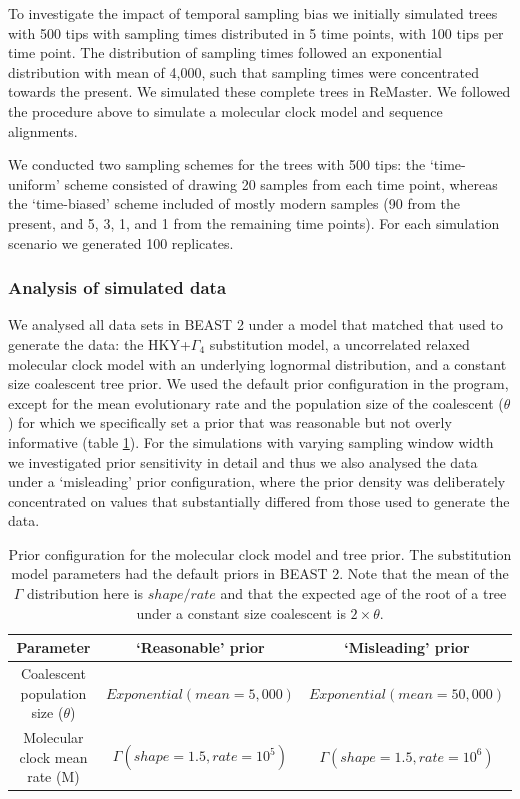 \documentclass[11pt]{article}
\begin{document}
To investigate the impact of temporal sampling bias we initially simulated trees with 500 tips with sampling times distributed in 5 time points, with 100 tips per time point. The distribution of sampling times followed an exponential distribution with mean of 4,000, such that sampling times were concentrated towards the present. We simulated these complete trees in ReMaster. We followed the procedure above to simulate a molecular clock model and sequence alignments. 

We conducted two sampling schemes for the trees with 500 tips: the `time-uniform' scheme consisted of drawing 20 samples from each time point, whereas the `time-biased' scheme included of mostly modern samples (90 from the present, and 5, 3, 1, and 1 from the remaining time points). For each simulation scenario we generated 100 replicates.

\subsubsection{Analysis of simulated data}
We analysed all data sets in BEAST 2 under a model that matched that used to generate the data: the HKY+$\Gamma_4$ substitution model, a uncorrelated relaxed molecular clock model with an underlying lognormal distribution, and a constant size coalescent tree prior. We used the default prior configuration in the program, except for the mean evolutionary rate and the population size of the coalescent ($\theta$) for which we specifically set a prior that was reasonable but not overly informative (table \ref{table:prior_distros}). For the simulations with varying sampling window width we investigated prior sensitivity in detail and thus we also analysed the data under a `misleading' prior configuration, where the prior density was deliberately concentrated on values that substantially differed from those used to generate the data.

\begin{table}[h]
	\caption{Prior configuration for the molecular clock model and tree prior. The substitution model parameters had the default priors in BEAST 2. Note that the mean of the $\Gamma$ distribution here is $shape/rate$ and that the expected age of the root of a tree under a constant size coalescent is $2\times \theta$.} 
	\begin{center} 
		\label{table:prior_distros}
		\begin{tabular}{ c|c|c }
			Parameter & `Reasonable' prior & `Misleading' prior \\
			\hline
			 Coalescent population size ($\theta$) & $Exponential(mean=5,000)$ & $Exponential(mean= 50,000)$\\
			Molecular clock mean rate (M) & $\Gamma(shape=1.5, rate=10^5)$ & $\Gamma(shape=1.5, rate=10^6)$ \\
		\end{tabular}
	\end{center}	%
\end{table}
\end{document}
